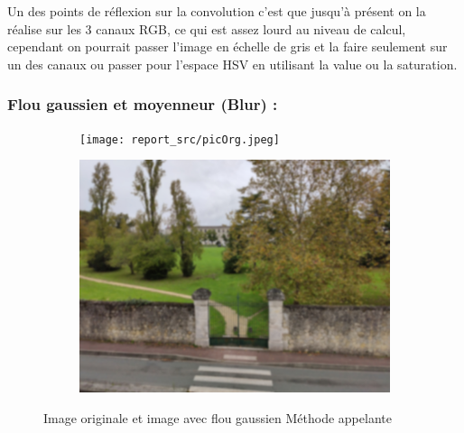     Un des points de réflexion sur la convolution c'est que jusqu'à présent on la réalise sur les 3 canaux RGB, ce qui est assez lourd au niveau de calcul,
    cependant on pourrait passer l'image en échelle de gris et la faire seulement sur un des canaux ou passer pour l'espace HSV en utilisant la value ou la saturation.

    \subsubsection{Flou gaussien et moyenneur (Blur) : }

        \begin{figure}[!h]
            \centering
            \begin{subfigure}[b]{0.4\textwidth}
                \texttt{[image: report\_src/picOrg.jpeg]}
            \end{subfigure}
            \begin{subfigure}[b]{0.4\textwidth}
                \includegraphics[width=1\textwidth]{report_src/blur.jpeg}
            \end{subfigure}
            \caption{Image originale et image avec flou gaussien
                    Méthode appelante }
        \end{figure} 





        
